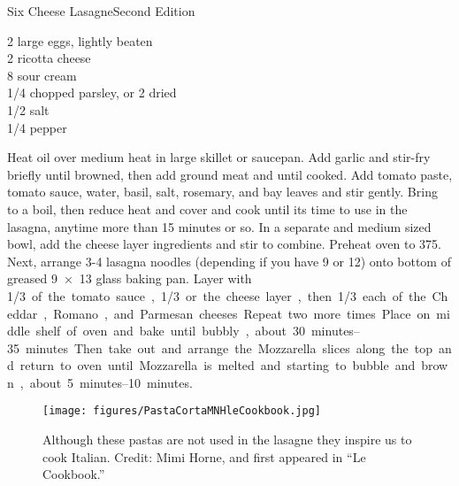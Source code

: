 \begin{entry}{Six Cheese Lasagne}{Second Edition}
\begin{ingredients}
    2 large eggs, lightly beaten\\
    \SI{2}{\cup} ricotta cheese\\
    \SI{8}{\ounce} sour cream \\
    \SI{1/4}{\cup} chopped parsley, or \SI{2}{\tblspoon} dried\\
    \SI{1/2}{\teaspoon} salt\\
    \SI{1/4}{\teaspoon} pepper
\end{ingredients}
%
%
Heat oil over medium heat in large skillet or saucepan. Add garlic and
stir-fry briefly until browned, then add ground meat and \saute until
cooked. Add tomato paste, tomato sauce, water, basil, salt, rosemary, and bay
leaves and stir gently. Bring to a boil, then reduce heat and cover and cook
until its time to use in the lasagna, anytime more than 15 minutes or so. In a
separate and medium sized bowl, add the cheese layer ingredients and stir to
combine. Preheat oven to \SI{375}{\degreeF}. Next, arrange 3-4 lasagna noodles
(depending if you have 9 or 12) onto bottom of greased \SI{9x13}{\inch} glass
baking pan. Layer with \SI{1/3} of the tomato sauce, \SI{1/3} or the cheese
layer, then \SI{1/3} each of the Cheddar, Romano, and Parmesan cheeses. Repeat
two more times. Place on middle shelf of oven and bake until bubbly, about
\SIrange{30}{35}{minutes}. Then take out and arrange the Mozzarella slices
along the top and return to oven until Mozzarella is melted and starting to
bubble and brown, about \SIrange{5}{10}{minutes}.
\begin{figure}[h]
  \centering
  \texttt{[image: figures/PastaCortaMNHleCookbook.jpg]}
  \caption{Although these pastas are not used in the lasagne they inspire us to cook Italian. Credit: Mimi Horne, and first appeared in ``Le Cookbook.''}
  \label{fig:mimi_pasta}
\end{figure}

\end{entry}

